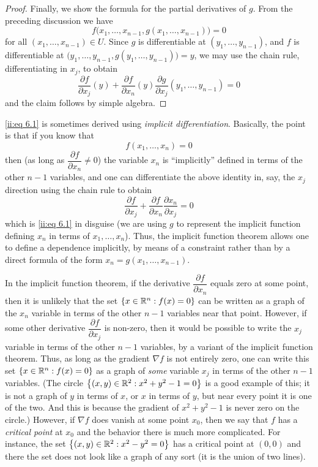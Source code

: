 \begin{proof}
  Finally, we show the formula for the partial derivatives of \(g\).
  From the preceding discussion we have
  \[
    f\big(x_1, \dots, x_{n - 1}, g(x_1, \dots, x_{n - 1})\big) = 0
  \]
  for all \((x_1, \dots, x_{n - 1}) \in U\).
  Since \(g\) is differentiable at \((y_1, \dots, y_{n - 1})\), and \(f\) is differentiable at \(\big(y_1, \dots, y_{n - 1}, g(y_1, \dots, y_{n - 1})\big) = y\), we may use the chain rule, differentiating in \(x_j\), to obtain
  \[
    \dfrac{\partial f}{\partial x_j}(y) + \dfrac{\partial f}{\partial x_n}(y) \dfrac{\partial g}{\partial x_j}(y_1, \dots, y_{n - 1}) = 0
  \]
  and the claim follows by simple algebra.
\end{proof}

\begin{rmk}\label{ii:6.8.2}
  \cref{ii:eq 6.1} is sometimes derived using \emph{implicit differentiation}.
  Basically, the point is that if you know that
  \[
    f(x_1, \dots, x_n) = 0
  \]
  then (as long as \(\dfrac{\partial f}{\partial x_n} \neq 0\)) the variable \(x_n\) is ``implicitly'' defined in terms of the other \(n - 1\) variables, and one can differentiate the above identity in, say, the \(x_j\) direction using the chain rule to obtain
  \[
    \dfrac{\partial f}{\partial x_j} + \dfrac{\partial f}{\partial x_n} \dfrac{\partial x_n}{\partial x_j} = 0
  \]
  which is \cref{ii:eq 6.1} in disguise
  (we are using \(g\) to represent the implicit function defining \(x_n\) in terms of \(x_1, \dots, x_n\)).
  Thus, the implicit function theorem allows one to define a dependence implicitly, by means of a constraint rather than by a direct formula of the form \(x_n = g(x_1, \dots, x_{n - 1})\).
\end{rmk}

\begin{note}
  In the implicit function theorem, if the derivative \(\dfrac{\partial f}{\partial x_n}\) equals zero at some point, then it is unlikely that the set \(\left\lbrace x \in \mathbb{R}^n : f(x) = 0\right\rbrace\) can be written as a graph of the \(x_n\) variable in terms of the other \(n - 1\) variables near that point.
  However, if some other derivative \(\dfrac{\partial f}{\partial x_j}\) is non-zero, then it would be possible to write the \(x_j\) variable in terms of the other \(n - 1\) variables, by a variant of the implicit function theorem.
  Thus, as long as the gradient \(\nabla f\) is not entirely zero, one can write this set \(\left\lbrace x \in \mathbb{R}^n : f(x) = 0\right\rbrace\) as a graph of \emph{some} variable \(x_j\) in terms of the other \(n - 1\) variables.
  (The circle \(\left\lbrace(x, y) \in \mathbb{R}^2 : x^2 + y^2 - 1 = 0\right\rbrace\) is a good example of this;
  it is not a graph of \(y\) in terms of \(x\), or \(x\) in terms of \(y\), but near every point it is one of the two.
  And this is because the gradient of \(x^2 + y^2 - 1\) is never zero on the circle.)
  However, if \(\nabla f\) does vanish at some point \(x_0\), then we say that \(f\) has a \emph{critical point} at \(x_0\) and the behavior there is much more complicated.
  For instance, the set \(\left\lbrace(x, y) \in \mathbb{R}^2 : x^2 - y^2 = 0\right\rbrace\) has a critical point at \((0, 0)\) and there the set does not look like a graph of any sort
  (it is the union of two lines).
\end{note}

